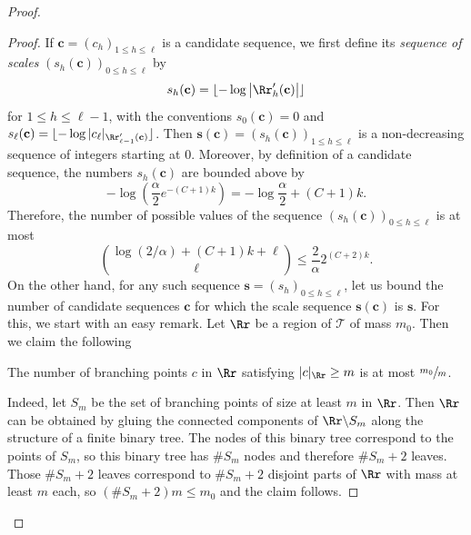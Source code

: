 \begin{proof}
\begin{proof}
If $\mathbf{c}=(c_h)_{1 \leq h \leq \ell}$ is a candidate sequence, we first define its \emph{sequence of scales} $\left( s_h(\mathbf{c}) \right)_{0 \leq h \leq \ell}$ by
\[ s_h(\mathbf{c}) = \lfloor -\log \left| \Rr'_h(\mathbf{c}) \right| \rfloor \]
for $1 \leq h \leq \ell-1$, with the conventions $s_0(\mathbf{c})=0$ and $s_{\ell}(\mathbf{c})=\lfloor -\log |c_{\ell}|_{\Rr'_{\ell-1}(\mathbf{c})} \rfloor$.
Then $\mathbf{s}(\mathbf{c})=\left( s_h(\mathbf{c}) \right)_{1 \leq h \leq \ell}$ is a non-decreasing sequence of integers starting at $0$.
Moreover, by definition of a candidate sequence, the numbers $s_h(\mathbf{c})$ are bounded above by
\[ -\log \left( \frac{\alpha}{2} e^{-(C+1)k}\right) = -\log \frac{\alpha}{2} + (C+1) k.\]
Therefore, the number of possible values of the sequence $\left( s_h(\mathbf{c}) \right)_{0 \leq h \leq \ell}$ is at most
\begin{equation}\label{eqn_number_scale_sequences}
\binom{\log (2/\alpha) + (C+1)k + \ell}{\ell} \leq \frac{2}{\alpha} 2^{(C+2)k}.
\end{equation}
On the other hand, for any such sequence $\mathbf{s}=(s_h)_{0 \leq h \leq \ell}$, let us bound the number of candidate sequences $\mathbf{c}$ for which the scale sequence $\mathbf{s}(\mathbf{c})$ is $\mathbf{s}$.
For this, we start with an easy remark.
Let $\Rr$ be a region of $\mathcal{T}$ of mass $m_0$.
Then we claim the following
\begin{claim*}
The number of branching points $c$ in $\Rr$ satisfying $|c|_{\Rr} \geq m$ is at most $\sfrac{m_0}{m}$.
\end{claim*}
Indeed, let $S_m$ be the set of branching points of size at least $m$ in $\Rr$.
Then $\Rr$ can be obtained by gluing the connected components of $\Rr \backslash S_m$ along the structure of a finite binary tree.
The nodes of this binary tree correspond to the points of $S_m$, so this binary tree has $\# S_m$ nodes and therefore $\# S_m+2$ leaves.
Those $\# S_m+2$ leaves correspond to $\# S_m+2$ disjoint parts of $\Rr$ with mass at least $m$ each, so $\left( \# S_m+2 \right) m \leq m_0$ and the claim follows.


\end{proof}
\end{proof}
